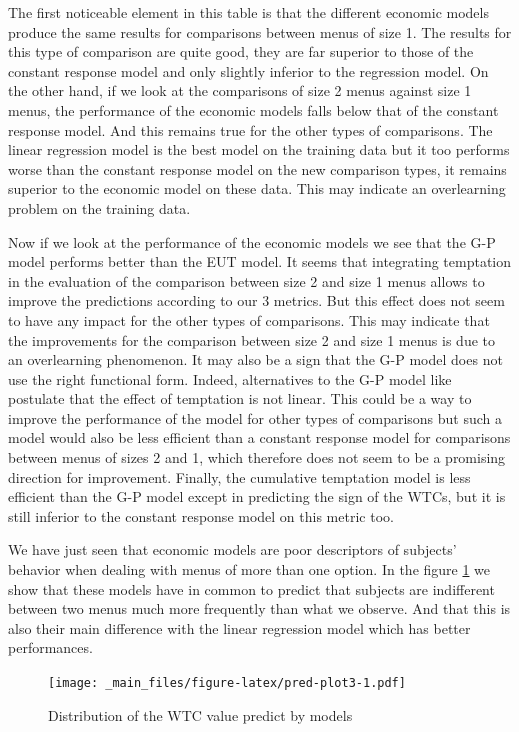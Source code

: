\documentclass[
]{book}
\begin{document}
The first noticeable element in this table is that the different economic models
produce the same results for comparisons between menus of size 1.
The results for this type of comparison are quite good, they are far superior to
those of the constant response model and only slightly inferior to the
regression model.
On the other hand, if we look at the comparisons of size 2 menus against size 1
menus, the performance of the economic models falls below that of the constant
response model.
And this remains true for the other types of comparisons.
The linear regression model is the best model on the training data but it too
performs worse than the constant response model on the new comparison types, it
remains superior to the economic model on these data. This may indicate an
overlearning problem on the training data.

Now if we look at the performance of the economic models we see that the G-P
model performs better than the EUT model.
It seems that integrating temptation in the evaluation of the comparison between
size 2 and size 1 menus allows to improve the predictions according to our 3
metrics.
But this effect does not seem to have any impact for the other types of
comparisons.
This may indicate that the improvements for the comparison between size 2 and
size 1 menus is due to an overlearning phenomenon.
It may also be a sign that the G-P model does not use the right functional form.
Indeed, alternatives to the G-P model like \citet{noor2015menu} postulate that the
effect of temptation is not linear.
This could be a way to improve the performance of the model for other types of
comparisons but such a model would also be less efficient than a constant
response model for comparisons between menus of sizes 2 and 1, which therefore
does not seem to be a promising direction for improvement.
Finally, the cumulative temptation model is less efficient than the G-P model
except in predicting the sign of the WTCs, but it is still inferior to the
constant response model on this metric too.

We have just seen that economic models are poor descriptors of subjects'
behavior when dealing with menus of more than one option.
In the figure \ref{fig:pred-plot3} we show that these models have in common to
predict that subjects are indifferent between two menus much more frequently
than what we observe.
And that this is also their main difference with the linear regression model
which has better performances.

\begin{figure}
\centering
\texttt{[image: \_main\_files/figure-latex/pred-plot3-1.pdf]}
\caption{\label{fig:pred-plot3}Distribution of the WTC value predict by models}
\end{figure}
\end{document}
